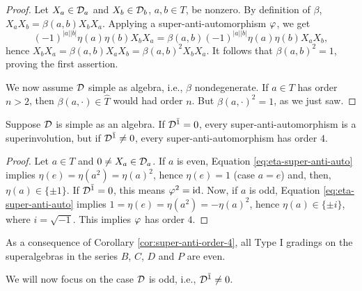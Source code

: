 \documentclass{amsbook}
\begin{document}
\begin{proof}
    Let $X_a\in \mathcal{D}_a$ and $X_b\in \mathcal{D}_b$, $a,b\in T$, be nonzero. By definition of $\beta$, $X_a X_b = \beta(a,b) X_b X_a$. Applying a super-anti-automorphism $\varphi$, we get \[(-1)^{|a||b|} \eta(a) \eta(b) X_b X_a = \beta(a,b) (-1)^{|a||b|} \eta(a) \eta(b) X_a X_b,\] hence $X_b X_a = \beta(a,b) X_a X_b = \beta(a,b)^2 X_b X_a$. It follows that $\beta(a,b)^2 = 1$, proving the first assertion.
    
    We now assume $\mathcal{D}$ simple as algebra, i.e., $\beta$ nondegenerate. If $a\in T$ has order $n>2$, then $\beta(a, \cdot)\in \widehat T$ would had order $n$. But $\beta(a, \cdot )^2 =1$, as we just saw.
\end{proof}

\begin{cor}\label{cor:super-anti-order-4}
    Suppose $\mathcal{D}$ is simple as an algebra. If $\mathcal{D}^{\bar1} = 0$, every super-anti-automorphism is a superinvolution, but if $\mathcal{D}^{\bar1} \neq 0$, every super-anti-automorphism has order $4$.
\end{cor}

\begin{proof}
    Let $a\in T$ and $0 \neq X_a \in \mathcal{D}_a$. If $a$ is even, Equation \eqref{eq:eta-super-anti-auto} implies $\eta(e) = \eta (a^2) = \eta(a)^2$, hence $\eta(e) = 1$ (case $a=e$) and, then,  $\eta(a) \in \{ \pm 1 \}$. If $\mathcal{D}^{\bar1} = 0$, this means $\varphi^2 = \operatorname{id}$. Now, if $a$ is odd, Equation \eqref{eq:eta-super-anti-auto} implies $1 = \eta(e) = \eta (a^2) = - \eta(a)^2$, hence $\eta(a) \in \{ \pm i \}$, where $i = \sqrt{-1}$. This implies $\varphi$ has order $4$.
\end{proof}

As a consequence of Corollary \ref{cor:super-anti-order-4}, all Type I gradings on the superalgebras in the series $B$, $C$, $D$ and $P$ are even.

We will now focus on the case $\mathcal{D}$ is odd, i.e., $\mathcal{D}^{\bar1} \neq 0$.
\end{document}

